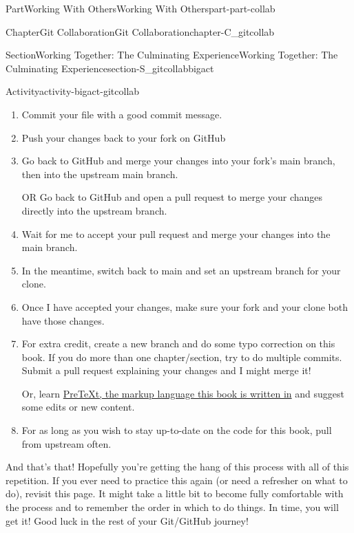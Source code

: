 \documentclass[oneside,10pt,]{book}
\begin{document}
\begin{partptx}{Part}{Working With Others}{}{Working With Others}{}{}{part-part-collab}
\begin{chapterptx}{Chapter}{Git Collaboration}{}{Git Collaboration}{}{}{chapter-C_gitcollab}
\begin{sectionptx}{Section}{Working Together: The Culminating Experience}{}{Working Together: The Culminating Experience}{}{}{section-S_gitcollabbigact}
\begin{activity}{Activity}{}{activity-bigact-gitcollab}
\begin{enumerate}[font=\bfseries,label=(\alph*),ref=\alph*]
\item{}Commit your file with a good commit message.%
\item{}Push your changes back to your fork on GitHub%
\item{}Go back to GitHub and merge your changes into your fork's main branch, then into the upstream main branch.%
\par
OR Go back to GitHub and open a pull request to merge your changes directly into the upstream branch.%
\item{}Wait for me to accept your pull request and merge your changes into the main branch.%
\item{}In the meantime, switch back to main and set an upstream branch for your clone.%
\item{}Once I have accepted your changes, make sure your fork and your clone both have those changes.%
\item{}For extra credit, create a new branch and do some typo correction on this book. If you do more than one chapter\slash{}section, try to do multiple commits. Submit a pull request explaining your changes and I might merge it!%
\par
Or, learn \href{https://pretextbook.org}{PreTeXt, the markup language this book is written in}\footnotemark{} and suggest some edits or new content.%
\item{}For as long as you wish to stay up-to-date on the code for this book, pull from upstream often.%
\end{enumerate}%
\end{activity}%
%
%
And that's that! Hopefully you're getting the hang of this process with all of this repetition. If you ever need to practice this again (or need a refresher on what to do), revisit this page. It might take a little bit to become fully comfortable with the process and to remember the order in which to do things. In time, you will get it! Good luck in the rest of your Git\slash{}GitHub journey!%
\end{sectionptx}
\end{chapterptx}
\end{partptx}
%
\appendix%
%
\end{document}
